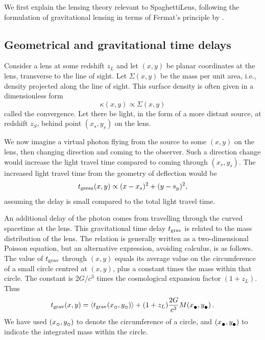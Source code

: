 \documentclass[usenatbib]{mn2e}
\newcommand{\spl}{SpaghettiLens\xspace}
\newcommand{\tgeom}{t_{\rm geom}}
\newcommand{\tgrav}{t_{\rm grav}}
\newcommand{\subcirc}{{\lower.33ex\hbox{$\circ$}}}
\newcommand{\subbullet}{{\lower.33ex\hbox{$\bullet$}}}
\begin{document}
We first explain the lensing theory relevant to \spl, following the
formulation of gravitational lensing in terms of Fermat's principle by
\cite{1986ApJ...310..568B}.


\subsection{Geometrical and gravitational time delays}

Consider a lens at some redshift $z_L$ and let $(x,y)$ be planar
coordinates at the lens, transverse to the line of sight.  Let
$\Sigma(x,y)$ be the mass per unit area, i.e., density projected along
the line of sight.  This surface density is often given in a
dimensionless form
\begin{equation} \label{eq:kappa}
\kappa(x,y) \propto \Sigma(x,y)
\end{equation}
called the convergence.  Let there be light, in the form of a more
distant source, at redshift $z_S$, behind point $(x_s,y_s)$ on the
lens.

We now imagine a virtual photon flying from the source to some $(x,y)$
on the lens, then changing direction and coming to the observer.  Such
a direction change would increase the light travel time compared to
coming through $(x_s,y_s)$.  The increased light travel time from the
geometry of deflection would be
\begin{equation} \label{eq:tgeom}
\tgeom(x,y) \propto (x-x_s)^2 + (y-s_y)^2 ,
\end{equation}
assuming the delay is small compared to the total light travel time.

An additional delay of the photon comes from travelling through the
curved spacetime at the lens.  This gravitational time delay $\tgrav$
is related to the mass distribution of the lens.  The relation is
generally written as a two-dimensional Poisson equation, but an
alternative expression, avoiding calculus, is as follows.  The value
of $\tgrav$ through $(x,y)$ equals its average value on the
circumference of a small circle centred at $(x,y)$, plus a constant
times the mass within that circle.  The constant is $2G/c^3$ times the
cosmological expansion factor $(1+z_L)$. Thus
\begin{equation} \label{eq:tgrav}
\tgrav(x,y) = \left\langle \tgrav(x_\subcirc,y_\subcirc) \right\rangle
              + (1+z_L) \frac{2G}{c^3} M(x_\subbullet,y_\subbullet) \,.
\end{equation}
We have used $(x_\subcirc,y_\subcirc)$ to denote the circumference of
a circle, and $(x_\subbullet,y_\subbullet)$ to indicate the integrated
mass within the circle.
\end{document}

